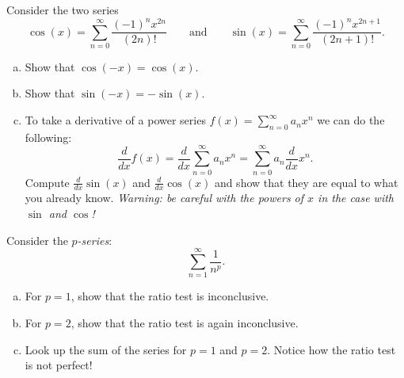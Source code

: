 \documentclass[12pt]{article} %
\begin{document}
\begin{problem}
Consider the two series
\[
\cos(x) = \sum_{n=0}^\infty \frac{(-1)^n x^{2n}}{(2n)!} \qquad \textrm{and} \qquad \sin(x) = \sum_{n=0}^\infty \frac{(-1)^n x^{2n+1}}{(2n+1)!}.
\]
\begin{enumerate}[(a)]
    \item Show that $\cos(-x)=\cos(x)$.
    \item Show that $\sin(-x)=-\sin(x)$.
    \item To take a derivative of a power series $f(x) = \displaystyle{\sum_{n=0}^\infty a_n x^n}$ we can do the following: 
    \[
    \frac{d}{dx}f(x) = \frac{d}{dx} \sum_{n=0}^\infty a_n x^n = \sum_{n=0}^\infty a_n \frac{d}{dx} x^n.
    \]
    Compute $\frac{d}{dx} \sin(x)$ and $\frac{d}{dx} \cos(x)$ and show that they are equal to what you already know. \emph{Warning: be careful with the powers of $x$ in the case with $\sin$ and $\cos$!}
\end{enumerate}
\end{problem}

\begin{problem}
Consider the \emph{$p$-series}:
\[
\sum_{n=1}^\infty \frac{1}{n^p}.
\]
\begin{enumerate}[(a)]
    \item For $p=1$, show that the ratio test is inconclusive.
    \item For $p=2$, show that the ratio test is again inconclusive.
    \item Look up the sum of the series for $p=1$ and $p=2$.  Notice how the ratio test is not perfect!
\end{enumerate}
\end{problem}
\end{document}
